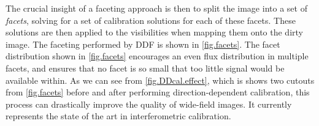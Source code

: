 \pg
The crucial insight of a faceting approach is then to split the image into a set of \emph{facets}, solving for a set of calibration solutions for each of these facets. These solutions are then applied to the visibilities when mapping them onto the dirty image. The faceting performed by DDF is shown in \cref{fig.facets}. The facet distribution shown in \cref{fig.facets} encourages an even flux distribution in multiple facets, and ensures that no facet is so small that too little signal would be available within. As we can see from \cref{fig.DDcal.effect}, which is shows two cutouts from \cref{fig.facets} before and after performing direction-dependent calibration, this process can drastically improve the quality of wide-field images. It currently represents the state of the art in interferometric calibration. 

